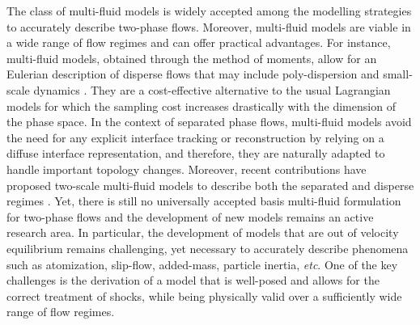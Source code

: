 \documentclass{myclass}
\begin{document}
The class of multi-fluid models is widely accepted among the modelling strategies to accurately describe two-phase flows. Moreover, multi-fluid models are viable in a wide range of flow regimes and can offer practical advantages. For instance, multi-fluid models, obtained through the method of moments, allow for an Eulerian description of disperse flows that may include poly-dispersion and small-scale dynamics \cite{loison:2025}. They are a cost-effective alternative to the usual Lagrangian models for which the sampling cost increases drastically with the dimension of the phase space.
In the context of separated phase flows, multi-fluid models avoid the need for any explicit interface tracking or reconstruction by relying on a diffuse interface representation, and therefore, they are naturally adapted to handle important topology changes. Moreover, recent contributions have proposed two-scale multi-fluid models to describe both the separated and disperse regimes \cite{frederix:2021,loison:2024}. Yet, there is still no universally accepted basis multi-fluid formulation for two-phase flows and the development of new models remains an active research area. In particular, the development of models that are out of velocity equilibrium remains challenging, yet necessary to accurately describe phenomena such as atomization, slip-flow, added-mass, particle inertia, \textit{etc}. One of the key challenges is the derivation of a model that is well-posed and allows for the correct treatment of shocks, while being physically valid over a sufficiently wide range of flow regimes.
\end{document}
